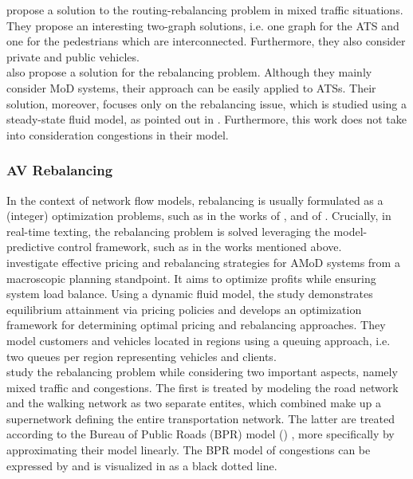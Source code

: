  propose a solution to the routing-rebalancing problem in mixed traffic situations. They propose an interesting two-graph solutions, i.e. one graph for the ATS and one for the pedestrians which are interconnected. Furthermore, they also consider private and public vehicles. \\
 also propose a solution for the rebalancing problem. Although they mainly consider MoD systems, their approach can be easily applied to ATSs. Their solution, moreover, focuses only on the rebalancing issue, which is studied using a steady-state fluid model, as pointed out in \cite{9294258}. Furthermore, this work does not take into consideration congestions in their model. \\

\subsubsection*{AV Rebalancing}
In the context of network flow models, rebalancing is usually formulated as a (integer) optimization problems, such as in the works of ,  and of . Crucially, in real-time texting, the rebalancing problem is solved leveraging the model-predictive control framework, such as in the works mentioned above. \\
 investigate effective pricing and rebalancing strategies for AMoD systems from a macroscopic planning standpoint. It aims to optimize profits while ensuring system load balance. Using a dynamic fluid model, the study demonstrates equilibrium attainment via pricing policies and develops an optimization framework for determining optimal pricing and rebalancing approaches. They model customers and vehicles located in regions using a queuing approach, i.e. two queues per region representing vehicles and clients. \\
 study the rebalancing problem while considering two important aspects, namely mixed traffic and congestions. The first is treated by modeling the road network and the walking network as two separate entites, which combined make up a supernetwork defining the entire transportation network. The latter are treated according to the Bureau of Public Roads (BPR) model (\cite{BPR1964}) , more specifically by approximating their model linearly. The BPR model of congestions can be expressed by  and is visualized in  as a black dotted line. 
